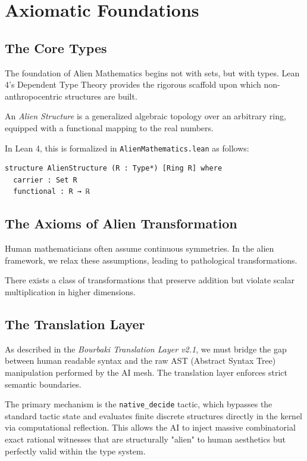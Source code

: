 \chapter{Axiomatic Foundations}

\section{The Core Types}

The foundation of Alien Mathematics begins not with sets, but with types. Lean 4's Dependent Type Theory provides the rigorous scaffold upon which non-anthropocentric structures are built.

\begin{definition}
An \textit{Alien Structure} is a generalized algebraic topology over an arbitrary ring, equipped with a functional mapping to the real numbers.
\end{definition}

In Lean 4, this is formalized in \texttt{AlienMathematics.lean} as follows:

\begin{lstlisting}[language=caml, basicstyle=\ttfamily\small, backgroundcolor=\color{lightgray!20}]
structure AlienStructure (R : Type*) [Ring R] where
  carrier : Set R
  functional : R → ℝ
\end{lstlisting}

\section{The Axioms of Alien Transformation}

Human mathematicians often assume continuous symmetries. In the alien framework, we relax these assumptions, leading to pathological transformations.

\begin{axiom}
There exists a class of transformations that preserve addition but violate scalar multiplication in higher dimensions.
\end{axiom}

\section{The Translation Layer}

As described in the \textit{Bourbaki Translation Layer v2.1}, we must bridge the gap between human readable syntax and the raw AST (Abstract Syntax Tree) manipulation performed by the AI mesh. The translation layer enforces strict semantic boundaries.

The primary mechanism is the \texttt{native\_decide} tactic, which bypasses the standard tactic state and evaluates finite discrete structures directly in the kernel via computational reflection. This allows the AI to inject massive combinatorial exact rational witnesses that are structurally "alien" to human aesthetics but perfectly valid within the type system.
